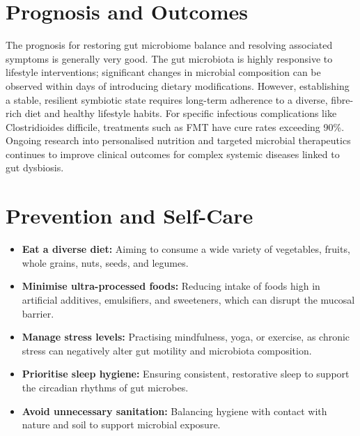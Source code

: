 \section*{Prognosis and Outcomes}
The prognosis for restoring gut microbiome balance and resolving associated symptoms is generally very good. The gut microbiota is highly responsive to lifestyle interventions; significant changes in microbial composition can be observed within days of introducing dietary modifications. However, establishing a stable, resilient symbiotic state requires long-term adherence to a diverse, fibre-rich diet and healthy lifestyle habits. For specific infectious complications like Clostridioides difficile, treatments such as FMT have cure rates exceeding 90\%. Ongoing research into personalised nutrition and targeted microbial therapeutics continues to improve clinical outcomes for complex systemic diseases linked to gut dysbiosis.

\section*{Prevention and Self-Care}
\begin{itemize}
    \item \textbf{Eat a diverse diet:} Aiming to consume a wide variety of vegetables, fruits, whole grains, nuts, seeds, and legumes.
    \item \textbf{Minimise ultra-processed foods:} Reducing intake of foods high in artificial additives, emulsifiers, and sweeteners, which can disrupt the mucosal barrier.
    \item \textbf{Manage stress levels:} Practising mindfulness, yoga, or exercise, as chronic stress can negatively alter gut motility and microbiota composition.
    \item \textbf{Prioritise sleep hygiene:} Ensuring consistent, restorative sleep to support the circadian rhythms of gut microbes.
    \item \textbf{Avoid unnecessary sanitation:} Balancing hygiene with contact with nature and soil to support microbial exposure.
\end{itemize}

